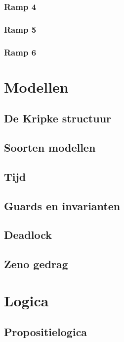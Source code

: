 \documentclass{article}
\begin{document}
	\subsubsection{Ramp 4}
	\subsubsection{Ramp 5}
	\subsubsection{Ramp 6}
	
	\section{Modellen}
	
	\subsection{De Kripke structuur}
	
	\subsection{Soorten modellen}
	
	\subsection{Tijd}
	
	\subsection{Guards en invarianten}
	
	\subsection{Deadlock}
	
	\subsection{Zeno gedrag}
	
	\section{Logica}
	
	\subsection{Propositielogica}
	
\end{document}
